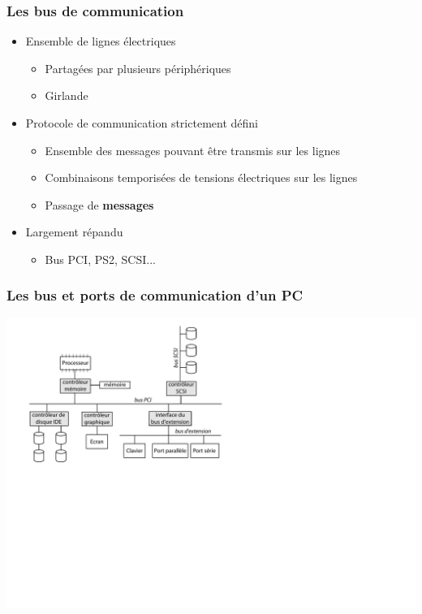 \begin{frame}
\frametitle{Les bus de communication}
\begin{itemize}
\item Ensemble de lignes électriques
\begin{itemize}
\item Partagées par plusieurs périphériques
\item Girlande
\end{itemize}
\item Protocole de communication strictement défini
\begin{itemize}
\item Ensemble des messages pouvant être transmis sur les lignes
\item Combinaisons temporisées de tensions électriques sur les lignes
\item Passage de \textbf{messages}
\end{itemize}
\item Largement répandu
\begin{itemize}
\item Bus PCI, PS2, SCSI...
\end{itemize}
\end{itemize}
\end{frame}

\begin{frame}
\frametitle{Les bus et ports de communication d'un PC}
\includegraphics[width=.8\textwidth]{../illustration/bus_pc.pdf}
\end{frame}

